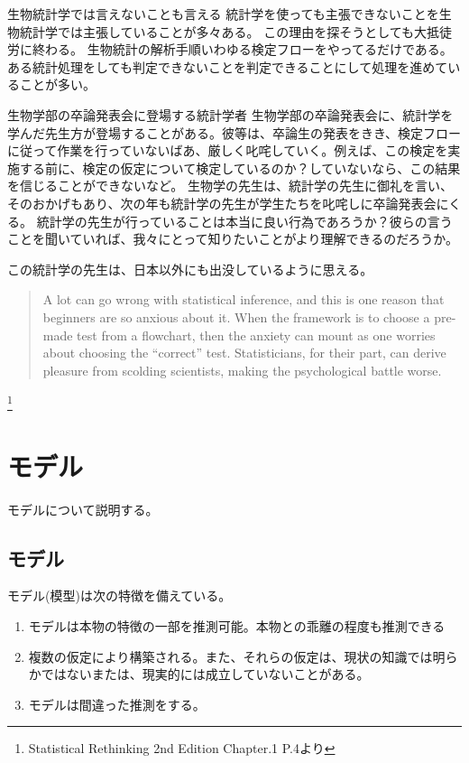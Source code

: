 \begin{SMbox}{生物統計学では言えないことも言える}
統計学を使っても主張できないことを生物統計学では主張していることが多々ある。
この理由を探そうとしても大抵徒労に終わる。
生物統計の解析手順いわゆる検定フローをやってるだけである。
ある統計処理をしても判定できないことを判定できることにして処理を進めていることが多い。
\end{SMbox}


\begin{SMbox}{生物学部の卒論発表会に登場する統計学者}
 生物学部の卒論発表会に、統計学を学んだ先生方が登場することがある。彼等は、卒論生の発表をきき、検定フローに従って作業を行っていないばあ、厳しく叱咤していく。例えば、この検定を実施する前に、検定の仮定について検定しているのか？していないなら、この結果を信じることができないなど。
 生物学の先生は、統計学の先生に御礼を言い、そのおかげもあり、次の年も統計学の先生が学生たちを叱咤しに卒論発表会にくる。
 統計学の先生が行っていることは本当に良い行為であろうか？彼らの言うことを聞いていれば、我々にとって知りたいことがより理解できるのだろうか。

 この統計学の先生は、日本以外にも出没しているように思える。
 \begin{quote}
  A lot can go wrong with statistical inference, and this is one reason that beginners are so anxious about it. When the framework is to choose a pre-made test from a flowchart, then the anxiety can mount as one worries about choosing the “correct” test. Statisticians, for their part, can derive pleasure from scolding scientists, making the psychological battle worse.
 \end{quote}\footnote{Statistical Rethinking 2nd Edition Chapter.1 P.4より}

\end{SMbox}

\chapter{モデル}
モデルについて説明する。

\section{モデル}
モデル(模型)は次の特徴を備えている。
\begin{enumerate}
 \item モデルは本物の特徴の一部を推測可能。本物との乖離の程度も推測できる
 \item 複数の仮定により構築される。また、それらの仮定は、現状の知識では明らかではないまたは、現実的には成立していないことがある。
 \item モデルは間違った推測をする。
\end{enumerate}
  
